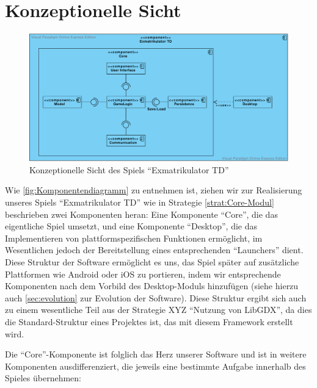 \documentclass[enabledeprecatedfontcommands,fontsize=12pt,paper=a4,twoside,parskip=half]{scrartcl}
\begin{document}
\clearpage

\section{Konzeptionelle Sicht}
\label{sec:konzeptionell}

\begin{figure}[H]
    \centering
    \includegraphics[width=\textwidth]{Bilder/Komponentendiagramm.pdf}
    \caption{Konzeptionelle Sicht des Spiels \enquote{Exmatrikulator TD}}
    \label{fig:Komponentendiagramm}
\end{figure}

Wie \autoref{fig:Komponentendiagramm} zu entnehmen ist, ziehen wir zur Realisierung unseres Spiels \enquote{Exmatrikulator TD} wie in Strategie \ref{strat:Core-Modul} beschrieben zwei Komponenten heran: Eine Komponente \enquote{Core}, die das eigentliche Spiel umsetzt, und eine Komponente \enquote{Desktop}, die das Implementieren von plattformspezifischen Funktionen ermöglicht, im Wesentlichen jedoch der Bereitstellung eines entsprechenden \enquote{Launchers} dient. Diese Struktur der Software ermöglicht es uns, das Spiel später auf zusätzliche Plattformen wie Android oder iOS zu portieren, indem wir entsprechende Komponenten nach dem Vorbild des Desktop-Moduls hinzufügen (siehe hierzu auch \autoref{sec:evolution} zur Evolution der Software). Diese Struktur ergibt sich auch zu einem wesentliche Teil aus der Strategie XYZ \enquote{Nutzung von LibGDX}, da dies die Standard-Struktur eines Projektes ist, das mit diesem Framework erstellt wird.

Die \enquote{Core}-Komponente ist folglich das Herz unserer Software und ist in weitere Komponenten ausdifferenziert, die jeweils eine bestimmte Aufgabe innerhalb des Spieles übernehmen:
\end{document}
